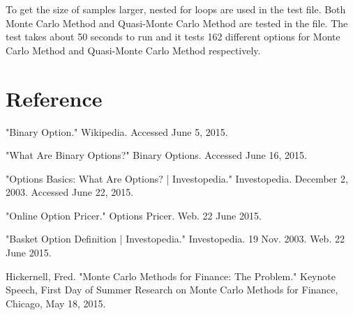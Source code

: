 \documentclass[]{elsarticle}
\theoremstyle{definition}
\theoremstyle{remark}
\begin{document}
To get the size of samples larger, nested for loops are used in the test file. Both Monte Carlo Method and Quasi-Monte Carlo Method are tested in the file. The test takes about 50 seconds to run and it tests 162 different options for Monte Carlo Method and Quasi-Monte Carlo Method respectively.

\section*{Reference}
"Binary Option." Wikipedia. Accessed June 5, 2015.

"What Are Binary Options?" Binary Options. Accessed June 16, 2015.

"Options Basics: What Are Options? | Investopedia." Investopedia. December 2, 2003. Accessed June 22, 2015.

"Online Option Pricer." Options Pricer. Web. 22 June 2015.

"Basket Option Definition | Investopedia." Investopedia. 19 Nov. 2003. Web. 22 June 2015.

Hickernell, Fred. "Monte Carlo Methods for Finance: The Problem." Keynote Speech, First Day of Summer Research on Monte Carlo Methods for Finance, Chicago, May 18, 2015.
\end{document}
